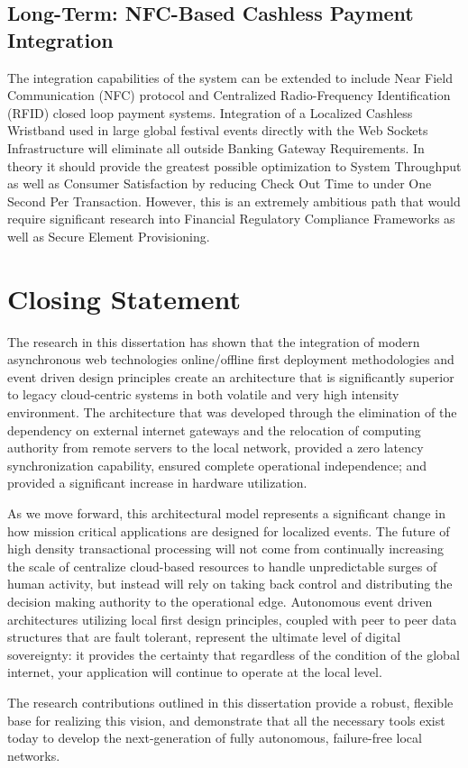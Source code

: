 \subsection{Long-Term: NFC-Based Cashless Payment Integration}
The integration capabilities of the system can be extended to include Near Field Communication (NFC) protocol and Centralized Radio-Frequency Identification (RFID) closed loop payment systems. Integration of a Localized Cashless Wristband used in large global festival events directly with the Web Sockets Infrastructure will eliminate all outside Banking Gateway Requirements. In theory it should provide the greatest possible optimization to System Throughput as well as Consumer Satisfaction by reducing Check Out Time to under One Second Per Transaction. However, this is an extremely ambitious path that would require significant research into Financial Regulatory Compliance Frameworks as well as Secure Element Provisioning.

\section{Closing Statement}
The research in this dissertation has shown that the integration of modern asynchronous web technologies online/offline first deployment methodologies and event driven design principles create an architecture that is significantly superior to legacy cloud-centric systems in both volatile and very high intensity environment. The architecture that was developed through the elimination of the dependency on external internet gateways and the relocation of computing authority from remote servers to the local network, provided a zero latency synchronization capability, ensured complete operational independence; and provided a significant increase in hardware utilization.

As we move forward, this architectural model represents a significant change in how mission critical applications are designed for localized events. The future of high density transactional processing will not come from continually increasing the scale of centralize cloud-based resources to handle unpredictable surges of human activity, but instead will rely on taking back control and distributing the decision making authority to the operational edge. Autonomous event driven architectures utilizing local first design principles, coupled with peer to peer data structures that are fault tolerant, represent the ultimate level of digital sovereignty: it provides the certainty that regardless of the condition of the global internet, your application will continue to operate at the local level.

The research contributions outlined in this dissertation provide a robust, flexible base for realizing this vision, and demonstrate that all the necessary tools exist today to develop the next-generation of fully autonomous, failure-free local networks.
